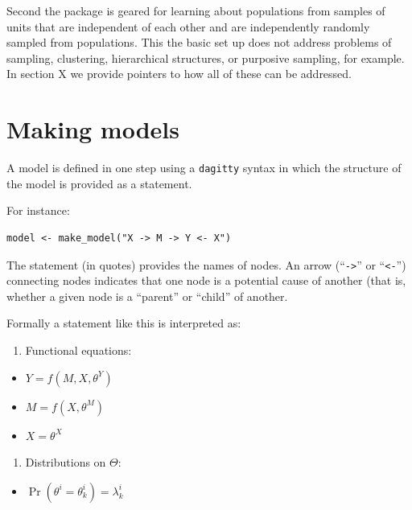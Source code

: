 \documentclass[
  article]{jss}
\providecommand{\tightlist}{%
  \setlength{\itemsep}{0pt}\setlength{\parskip}{0pt}}\usepackage{longtable,booktabs,array}
\begin{document}
Second the package is geared for learning about populations from samples
of units that are independent of each other and are independently
randomly sampled from populations. This the basic set up does not
address problems of sampling, clustering, hierarchical structures, or
purposive sampling, for example. In section X we provide pointers to how
all of these can be addressed.

\hypertarget{sec-models}{%
\section{Making models}\label{sec-models}}

A model is defined in one step using a \texttt{dagitty} syntax in which
the structure of the model is provided as a statement.

For instance:

\begin{verbatim}
model <- make_model("X -> M -> Y <- X")
\end{verbatim}

The statement (in quotes) provides the names of nodes. An arrow
(``\texttt{-\textgreater{}}'' or ``\texttt{\textless{}-}'') connecting
nodes indicates that one node is a potential cause of another (that is,
whether a given node is a ``parent'' or ``child'' of another.

Formally a statement like this is interpreted as:

\begin{enumerate}
\def\labelenumi{\arabic{enumi}.}
\tightlist
\item
  Functional equations:
\end{enumerate}

\begin{itemize}
\tightlist
\item
  \(Y = f(M, X, \theta^Y)\)
\item
  \(M = f(X, \theta^M)\)
\item
  \(X = \theta^X\)
\end{itemize}

\begin{enumerate}
\def\labelenumi{\arabic{enumi}.}
\setcounter{enumi}{1}
\tightlist
\item
  Distributions on \(\Theta\):
\end{enumerate}

\begin{itemize}
\tightlist
\item
  \(\Pr(\theta^i = \theta^i_k) = \lambda^i_k\)
\end{itemize}
\end{document}
